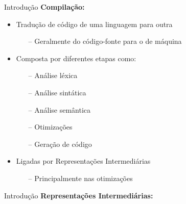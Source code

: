 \begin{frame}{Introdução}
    \textbf{Compilação:}
    \begin{itemize}
        \item Tradução de código de uma linguagem para outra
              \begin{itemize}
                  \item[--] Geralmente do código-fonte para o de máquina
              \end{itemize}
        \item Composta por diferentes etapas como:
              \begin{itemize}
                  \item[--] Análise léxica
                  \item[--] Análise sintática
                  \item[--] Análise semântica
                  \item[--] Otimizações
                  \item[--] Geração de código
              \end{itemize}
        \item Ligadas por Representações Intermediárias
              \begin{itemize}
                  \item[--] Principalmente nas otimizações~\cite{PLOTKIN1975125}
              \end{itemize}
    \end{itemize}
\end{frame}

\begin{frame}{Introdução}
    \textbf{Representações Intermediárias:}
\end{frame}
